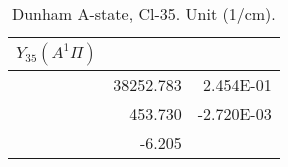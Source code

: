 \begin{table}[h]
\begin{tabular}{crr}
\toprule
$Y_{35} (A^1\Pi)$\\ \midrule 
& 38252.783 & 2.454E-01 \\
& 453.730 & -2.720E-03 \\
& -6.205 \\
\bottomrule
\end{tabular}\caption{Dunham A-state, Cl-35. Unit (1/cm).}\end{table}
